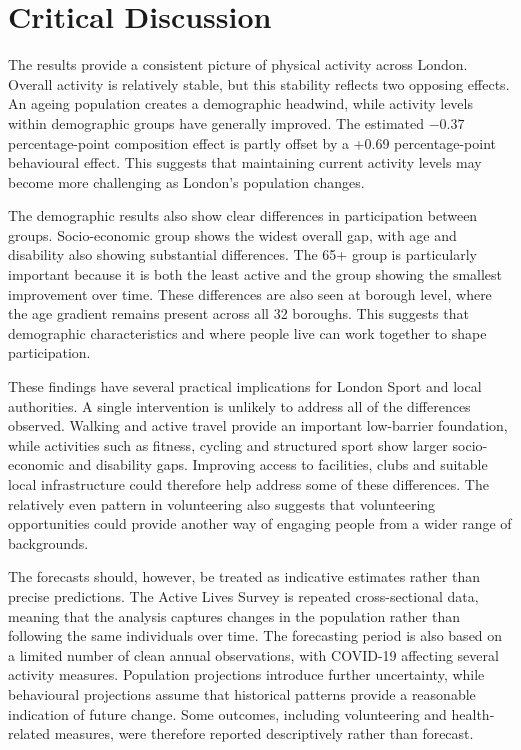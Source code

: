 \documentclass[ %
                    author={Ashrey Ashrey, Sanya Kapoor, Trisha Sharma, Yash Bhooshan Pandloskar},
                supervisor={Dr. Dalila O’Grady},
                    degree={MSc},
                     title={Using machine learning to forecast physical activity participation, volunteering and activity patterns in London},
                  subtitle={},
                      type={},
                      year={2021}]{dissertation}
\begin{document}
\FloatBarrier
\setcounter{section}{4}
\section{Critical Discussion}

\noindent
The results provide a consistent picture of physical activity across London. Overall activity is relatively stable, but this stability reflects two opposing effects. An ageing population creates a demographic headwind, while activity levels within demographic groups have generally improved. The estimated $-0.37$ percentage-point composition effect is partly offset by a +0.69 percentage-point behavioural effect. This suggests that maintaining current activity levels may become more challenging as London's population changes.

The demographic results also show clear differences in participation between groups. Socio-economic group shows the widest overall gap, with age and disability also showing substantial differences. The 65+ group is particularly important because it is both the least active and the group showing the smallest improvement over time. These differences are also seen at borough level, where the age gradient remains present across all 32 boroughs. This suggests that demographic characteristics and where people live can work together to shape participation.

These findings have several practical implications for London Sport and local authorities. A single intervention is unlikely to address all of the differences observed. Walking and active travel provide an important low-barrier foundation, while activities such as fitness, cycling and structured sport show larger socio-economic and disability gaps. Improving access to facilities, clubs and suitable local infrastructure could therefore help address some of these differences. The relatively even pattern in volunteering also suggests that volunteering opportunities could provide another way of engaging people from a wider range of backgrounds.

The forecasts should, however, be treated as indicative estimates rather than precise predictions. The Active Lives Survey is repeated cross-sectional data, meaning that the analysis captures changes in the population rather than following the same individuals over time. The forecasting period is also based on a limited number of clean annual observations, with COVID-19 affecting several activity measures. Population projections introduce further uncertainty, while behavioural projections assume that historical patterns provide a reasonable indication of future change. Some outcomes, including volunteering and health-related measures, were therefore reported descriptively rather than forecast.
\end{document}
